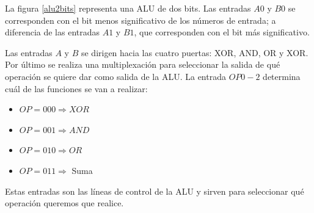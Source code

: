 \documentclass[a4paper, 11pt, titlepage]{article}
\begin{document}
		La figura \ref{alu2bits} representa una ALU de dos bits. Las entradas $A0$ y $B0$ se corresponden 
		con el bit menos significativo de los números de entrada; a diferencia de las entradas $A1$ y $B1$, 
		que corresponden con el bit más significativo.

		Las entradas $A$ y $B$ se dirigen hacia las cuatro puertas: XOR, AND, OR y XOR. Por último se realiza 
		una multiplexación para seleccionar la salida de qué operación se quiere dar como salida de la ALU. 
		La entrada $OP0-2$ determina cuál de las funciones se van a realizar:

		\begin{itemize}
			\item $OP = 000 \Rightarrow XOR$
			\item $OP = 001 \Rightarrow AND$
			\item $OP = 010 \Rightarrow OR$
			\item $OP = 011 \Rightarrow $ Suma
		\end{itemize}
  
		Estas entradas son las líneas de control de la ALU y sirven para seleccionar qué operación queremos que 
		realice.
\end{document}
